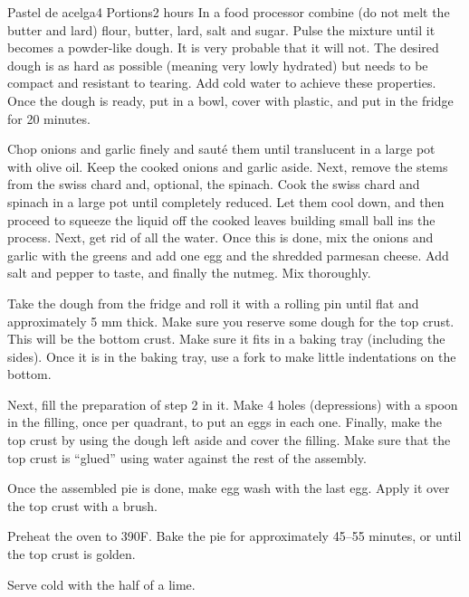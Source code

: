 \documentclass{article}
\begin{document}
\begin{recipe}{Pastel de acelga}{4 Portions}{2 hours}
  In a food processor combine (do not melt the butter and lard) flour, butter,
  lard, salt and sugar. Pulse the mixture until it becomes a powder-like dough.
  It is very probable that it will not. The desired dough is as hard as possible
  (meaning very lowly hydrated) but needs to be compact and resistant to
  tearing. Add cold water to achieve these properties. Once the dough is ready,
  put in a bowl, cover with plastic, and put in the fridge for 20 minutes.

  Chop onions and garlic finely and saut\'{e} them until
  translucent in a large pot with olive oil. Keep the cooked onions and garlic aside. Next,
  remove the stems from the swiss chard and, optional, the spinach. Cook the
  swiss chard and spinach in a large pot until completely reduced. Let them cool
  down, and then proceed to squeeze the liquid off the cooked leaves building
  small ball ins the process. Next, get rid of all the water. Once this is done,
  mix the onions and garlic with the greens and add one egg and the shredded
  parmesan cheese. Add salt and pepper to taste, and finally the nutmeg. Mix thoroughly.

  Take the dough from the fridge and roll it with a rolling pin until flat and
  approximately 5 mm thick. Make sure you reserve some dough for the top crust.
  This will be the bottom crust. Make sure it fits
  in a baking tray (including the sides). Once it is in the baking tray, use a
  fork to make little indentations on the bottom.

  Next, fill the preparation of step 2 in it. Make 4 holes (depressions) with
  a spoon in the filling, once per quadrant, to put an eggs in each one. Finally, make
  the top crust by using the dough left aside and cover the filling. Make sure
  that the top crust is ``glued'' using water against the rest of the assembly.

  Once the assembled pie is done, make egg wash with the last egg. Apply it over
  the top crust with a brush.

  \freeform
  Preheat the oven to 390\degrees{}F. Bake the pie for approximately 45--55
  minutes, or until the top crust is golden.

  Serve cold with the half of a lime.
  
\end{recipe}
\end{document}
